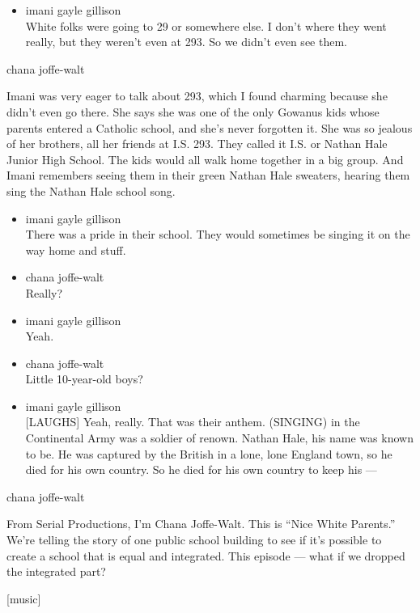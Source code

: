 \begin{itemize}
\tightlist
\item
  imani gayle gillison\\
  White folks were going to 29 or somewhere else. I don't where they
  went really, but they weren't even at 293. So we didn't even see them.
\end{itemize}

chana joffe-walt

Imani was very eager to talk about 293, which I found charming because
she didn't even go there. She says she was one of the only Gowanus kids
whose parents entered a Catholic school, and she's never forgotten it.
She was so jealous of her brothers, all her friends at I.S. 293. They
called it I.S. or Nathan Hale Junior High School. The kids would all
walk home together in a big group. And Imani remembers seeing them in
their green Nathan Hale sweaters, hearing them sing the Nathan Hale
school song.

\begin{itemize}
\item
  imani gayle gillison\\
  There was a pride in their school. They would sometimes be singing it
  on the way home and stuff.
\item
  chana joffe-walt\\
  Really?
\item
  imani gayle gillison\\
  Yeah.
\item
  chana joffe-walt\\
  Little 10-year-old boys?
\item
  imani gayle gillison\\
  {[}LAUGHS{]} Yeah, really. That was their anthem. (SINGING) in the
  Continental Army was a soldier of renown. Nathan Hale, his name was
  known to be. He was captured by the British in a lone, lone England
  town, so he died for his own country. So he died for his own country
  to keep his ---
\end{itemize}

chana joffe-walt

From Serial Productions, I'm Chana Joffe-Walt. This is ``Nice White
Parents.'' We're telling the story of one public school building to see
if it's possible to create a school that is equal and integrated. This
episode --- what if we dropped the integrated part?

{[}music{]}

